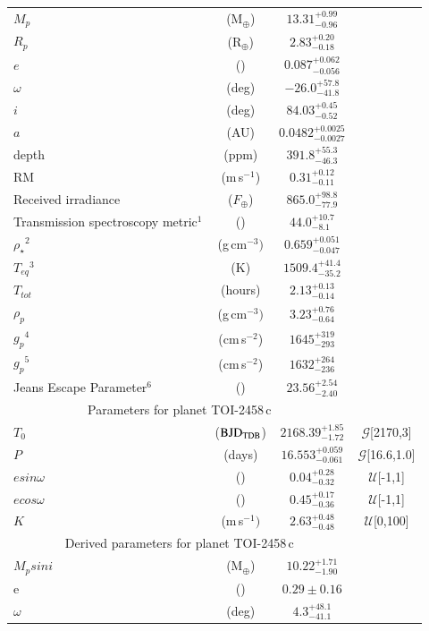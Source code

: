 \documentclass[traditabstract,longauth]{aa}
\providecommand{\bjdtdb}{\ensuremath{\rm {BJD_{TDB}}}}
\begin{document}
\begin{longtable}{lccc}
$M_p$ & (M$_{\oplus}$) & $ 13.31_{-0.96}^{+0.99} $ \\ 
$R_p$ & (R$_{\oplus}$) & $ 2.83_{-0.18}^{+0.20} $ \\
$e$ & () & $ 0.087_{-0.056}^{+0.062} $ \\ 
$\omega$ & (deg) & $ -26.0_{-41.8}^{+57.8} $ \\
$i$ & (deg) & $ 84.03_{-0.52}^{+0.45} $ \\ 
$a$ & (AU) & $ 0.0482_{-0.0027}^{+0.0025} $ \\ 
depth & (ppm) & $ 391.8_{-46.3}^{+55.3} $ \\ 
RM & (m\,s$^{-1}$) & $ 0.31_{-0.11}^{+0.12} $ \\ 
Received irradiance & ($F_{\oplus}$) & $ 865.0_{-77.9}^{+98.8} $ \\ 
Transmission spectroscopy metric$^1$ & () & $ 44.0_{-8.1}^{+10.7} $ \\  
$\rho_\star$$^2$ &(g\,cm$^{-3})$ & $ 0.659_{-0.047}^{+0.051} $ \\ 
$T_{eq}$$^3$ & (K) & $ 1509.4_{-35.2}^{+41.4} $ \\ 
$T_{tot}$ & (hours) & $ 2.13_{-0.14}^{+0.13} $ \\  
$\rho_p$ & (g\,cm$^{-3})$ & $ 3.23_{-0.64}^{+0.76} $ \\  
$g_p$$^4$ & (cm\,s$^{-2}$) & $ 1645_{-293}^{+319} $ \\
$g_p$$^5$ & (cm\,s$^{-2}$) & $ 1632_{-236}^{+264} $ \\
Jeans Escape Parameter$^6$ & () & $ 23.56_{-2.40}^{+2.54} $ \\ 
\hline
\multicolumn{3}{c}{Parameters for planet TOI-2458\,c} \\
\hline
$T_0$ & (\bjdtdb) &  $ 2168.39_{-1.72}^{+1.85} $ & $\mathcal{G}$[2170,3] \\ 
$P$ & (days) &  $ 16.553_{-0.061}^{+0.059} $ & $\mathcal{G}$[16.6,1.0] \\
{$esin\omega$} & () & $ 0.04_{-0.32}^{+0.28} $ & $\mathcal{U}$[-1,1] \\
{$ecos\omega$} & () & $ 0.45_{-0.36}^{+0.17} $ & $\mathcal{U}$[-1,1] \\
$K$ & (m\,s$^{-1})$ & $ 2.63_{-0.48}^{+0.48} $ & $\mathcal{U}$[0,100] \\
\hline
\multicolumn{3}{c}{Derived parameters for planet TOI-2458\,c} \\
\hline
$M_psini$ & (M$_{\oplus}$) & $ 10.22_{-1.90}^{+1.71} $\\
e & () & $ 0.29 \pm 0.16 $ \\ 
$\omega$ & (deg) & $ 4.3_{-41.1}^{+48.1} $ \\ 

\end{longtable}
\end{document}
